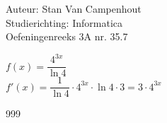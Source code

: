 \documentclass[a4paper]{article}
\begin{document}
  
\noindent \large Auteur: Stan Van Campenhout \\
\noindent \large Studierichting:  Informatica\\
\noindent \large Oefeningenreeks 3A nr. 35.7\\

\medskip

\normalsize

$ f(x) = \dfrac{4^{3x}}{\ln 4} $\\

$ f'(x) = \dfrac{1}{\ln 4} \cdot 4^{3x} \cdot \ln 4 \cdot 3 = 3 \cdot 4^{3x} $\\

\begin{thebibliography}{999}
\end{thebibliography}
\end{document}

